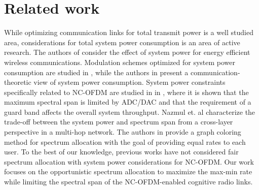 \documentclass[conference]{IEEEtran}
\begin{document}
\section{Related work}
\label{sec:relwork}
While optimizing communication links for total transmit power is a well studied area, considerations for total system power consumption is an area of active research. The authors of \cite{Li11energysurvey} consider the effect of system power for energy efficient wireless communications. Modulation schemes optimized for system power consumption are studied in \cite{shug05energyopt}, while the authors in \cite{grover11syspower} present a communication-theoretic view of system power consumption. System power constraints specifically related to NC-OFDM are studied in in \cite{jia11cap, cao10dsa}, where it is shown that the maximum spectral span is limited by ADC/DAC \cite{jia11cap} and that the requirement of a guard band affects the overall system throughput. Nazmul et. al \cite{Nazmul_NCOFDM1} characterize the trade-off between the system power and spectrum span from a cross-layer perspective in a multi-hop network. The authors in \cite{zhang10grcol} provide a graph coloring method for  spectrum allocation with the goal of providing equal rates to each user. To the best of our knowledge, previous works have not considered fair spectrum allocation with system power considerations for NC-OFDM. Our work focuses on the opportunistic spectrum allocation to maximize the max-min rate while limiting the spectral span of the NC-OFDM-enabled cognitive radio links. 
\end{document}
